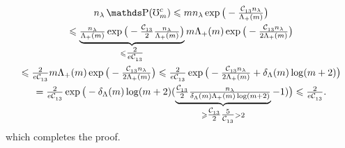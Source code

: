 \begin{pro}
\begin{multline*}
\ssE\P(\aixEv^c)\leq \Di\ssE\exp\big(-\tfrac{\cst{13}\ssE}{\miSv}\big)\\
\leq\underbrace{\tfrac{\ssE}{\miSv}\exp\big(-\tfrac{\cst{13}}{2}\tfrac{\ssE}{\miSv}\big)}_{\leq\tfrac{2}{e\cst{13}}}\Di\miSv\exp\big(-\tfrac{\cst{13}\ssE}{2\miSv}\big)\\
\leq \tfrac{2}{e\cst{13}} \Di\miSv\exp\big(-\tfrac{\cst{13}\ssE}{2\miSv}\big)
\leq%
\tfrac{2}{e\cst{13}}\exp\big(-\tfrac{\cst{13}\ssE}{2\miSv}+\cmiSv\log(\Di+2)\big)\\
=\tfrac{2}{e\cst{13}}\exp\big(-\cmiSv\log(\Di+2)(\underbrace{\tfrac{\cst{13}}{2}\tfrac{\ssE}{\cmiSv\miSv\log(\Di+2)}}_{\geq\tfrac{\cst{13}}{2} \tfrac{5}{\cst{13}}>2}-1)\big)
\leq \tfrac{2}{e\cst{13}}.
\end{multline*}
which completes the proof.
\proEnd\end{pro}

